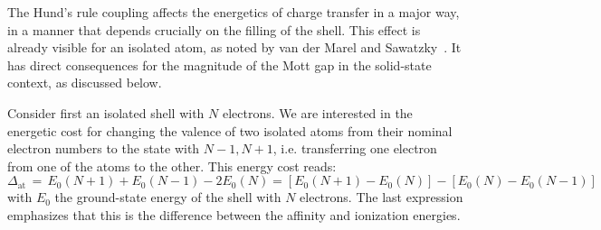 \documentclass[]{ar2e-changed}%
\def\Gapat{\Delta_{\mathrm{at}}}
\begin{document}
The Hund's rule coupling affects the energetics of charge transfer in a major way, in a manner 
that depends crucially on the filling of the shell. 
This effect is already visible for an isolated atom, as noted by van der Marel and Sawatzky~\cite{vandermarel_sawatzky_prb_1988,vandermarel_phd_1985}. 
It has direct consequences for the magnitude of the Mott gap in the solid-state context, as discussed below.  

Consider first an isolated shell with $N$ electrons. We are interested in the energetic cost for changing the valence of two isolated atoms 
from their nominal electron numbers to the state with $N-1,N+1$, i.e. transferring one electron from one of the atoms to the other.
This energy cost reads:
\begin{equation}
\Gapat\,=\,E_0(N+1)+E_0(N-1)-2E_0(N) = [E_0(N+1)-E_0(N)]-[E_0(N)-E_0(N-1)]
\label{eq:atomic_gap}
\end{equation} 
with $E_0$ the ground-state energy of the shell with $N$ electrons. The last expression emphasizes that this is 
the difference between the affinity and ionization  energies. 
\end{document}
